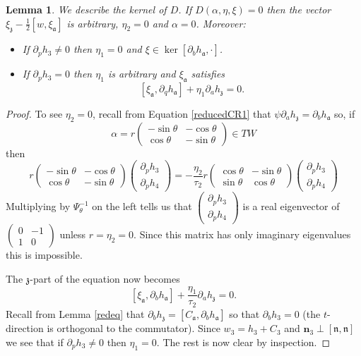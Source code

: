 \documentclass[11pt]{amsart}
\newcommand{\WW}{W}
\newcommand{\nn}{\mathfrak{n}}
\renewcommand{\aa}{\mathfrak{a}}
\newcommand{\zz}{\mathfrak{z}}
\numberwithin{equation}{section}
\newtheorem{lma}[equation]{Lemma}
\theoremstyle{definition}
\theoremstyle{remark}
\begin{document}
\begin{lma}\label{kernli}
We describe the kernel of $D$. If $D(\alpha,\eta,\xi)=0$ then the vector $\xi_{\zz}-\frac{1}{2}[w,\xi_{\aa}]$ is arbitrary, $\eta_2=0$ and $\alpha=0$. Moreover:
\begin{itemize}
\item If $\partial_ph_3\neq 0$ then $\eta_1=0$ and $\xi\in\ker[\partial_bh_{\aa},\cdot]$.
\item If $\partial_ph_3=0$ then $\eta_1$ is arbitrary and $\xi_{\aa}$ satisfies
\[[\xi_{\aa},\partial_qh_{\aa}]+\eta_1\partial_ah_{\zz}=0.\]
\end{itemize}
\end{lma}
\begin{proof}
To see $\eta_2=0$, recall from Equation \eqref{reducedCR1} that $\psi\partial_ah_{\zz}=\partial_bh_{\aa}$ so, if
\[\alpha=r\left(\begin{array}{cc}
-\sin\theta & -\cos\theta\\
\cos\theta & -\sin\theta
\end{array}\right)\in T\WW\]
then
\[r\left(\begin{array}{cc}
-\sin\theta & -\cos\theta\\
\cos\theta & -\sin\theta
\end{array}\right)\left(\begin{array}{c}
\partial_ph_3\\
\partial_ph_4
\end{array}\right)=-\frac{\eta_2}{\tau_2}r\left(\begin{array}{cc}
\cos\theta & -\sin\theta\\
\sin\theta & \cos\theta
\end{array}\right)\left(\begin{array}{c}
\partial_ph_3\\
\partial_ph_4
\end{array}\right)\]
Multiplying by $\Psi_{\theta}^{-1}$ on the left tells us that $\left(\begin{array}{c}\partial_ph_3\\ \partial_ph_4\end{array}\right)$ is a real eigenvector of $\left(\begin{array}{cc}0 & -1\\ 1 & 0\end{array}\right)$ unless $r=\eta_2=0$. Since this matrix has only imaginary eigenvalues this is impossible.

The $\zz$-part of the equation now becomes
\[[\xi_{\aa},\partial_bh_{\aa}]+\frac{\eta_1}{\tau_2}\partial_ah_{\zz}=0.\]
Recall from Lemma \ref{redeq} that $\partial_bh_{\zz}=[C_{\aa},\partial_bh_{\aa}]$ so that $\partial_bh_3=0$ (the $t$-direction is orthogonal to the commutator). Since $w_3=h_3+C_3$ and $\mathbf{n}_3\perp[\nn,\nn]$ we see that if $\partial_ph_3\neq 0$ then $\eta_1=0$. The rest is now clear by inspection.
\end{proof}
\end{document}
